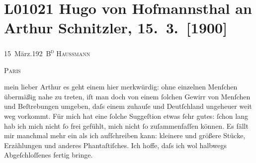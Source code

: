 

\section[Hugo von Hofmannsthal an Arthur Schnitzler, 15. 3. {[}1900{]}]{L01021 Hugo von Hofmannsthal an Arthur Schnitzler, 15. 3. {[}1900{]}}
\nopagebreak{}
\rehead{ }\normalsize\beginnumbering{}
\toendnotes[C]{\smallbreak\pagebreak[2]}
\toendnotes[C]{\smallbreak}
\toendnotes[C]{\smallbreak}
\pstart
           {\pb}15 März.\hfill \textsc{192 B\textsuperscript{d}
                           Haussmann}\pend
           
\pstart
           \raggedleft{}\textsc{Paris}\pend
           
\pstart{}mein lieber Arthur\pend\vspace{0.5em}
\pstart
           es geht einem hier merkwürdig: ohne einzelnen Menſchen übermäßig nahe zu treten, iſt
               man doch von einem{ }ſolchen Gewirr von Menſchen und Beſtrebungen umgeben, daſs einem
               zuhauſe und Deutſchland ungeheuer weit weg
               vorkommt. Für mich hat eine{ }ſolche Suggeſtion etwas{ }ſehr gutes:{ }ſchon lang hab ich
               mich nicht{ }ſo frei gefühlt, mich {\pb}nicht{ }ſo zuſammenfaſſen können. Es fällt mir manchmal mehr ein als ich aufſchreiben
               kann: kleinere und größere Stücke, Erzählungen und anderes Phantaſtiſches. Ich hoffe,
               daſs ich wol halbwegs Abgeſchloſſenes fertig bringe.\pend
           
